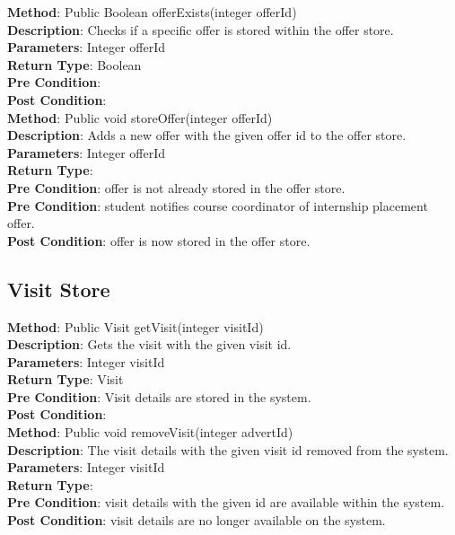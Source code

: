 \documentclass{l3deliverable}
\begin{document}
\textbf{Method}: Public Boolean offerExists(integer offerId) \\
\textbf{Description}: Checks if a specific offer is stored within the offer store. \\
\textbf{Parameters}: Integer offerId\\
\textbf{Return Type}: Boolean\\
\textbf{Pre Condition}:\\
\textbf{Post Condition}:\\

\textbf{Method}: Public void storeOffer(integer offerId)\\
\textbf{Description}: Adds a new offer with the given offer id to the offer store. \\
\textbf{Parameters}: Integer offerId\\
\textbf{Return Type}:\\
\textbf{Pre Condition}: offer is not already stored in the offer store.\\
\textbf{Pre Condition}: student notifies course coordinator of internship placement offer.\\
\textbf{Post Condition}: offer is now stored in the offer store.\\

\subsection{Visit Store}

\textbf{Method}: Public Visit getVisit(integer visitId)\\
\textbf{Description}: Gets the visit with the given visit id. \\
\textbf{Parameters}: Integer visitId\\
\textbf{Return Type}: Visit\\
\textbf{Pre Condition}: Visit details are stored in the system.\\
\textbf{Post Condition}:\\

\textbf{Method}: Public void removeVisit(integer advertId)\\
\textbf{Description}: The visit details with the given visit id removed from the system. \\
\textbf{Parameters}: Integer visitId\\
\textbf{Return Type}:\\
\textbf{Pre Condition}: visit details with the given id are available within the system.\\
\textbf{Post Condition}: visit details are no longer available on the system.\\
\end{document}
